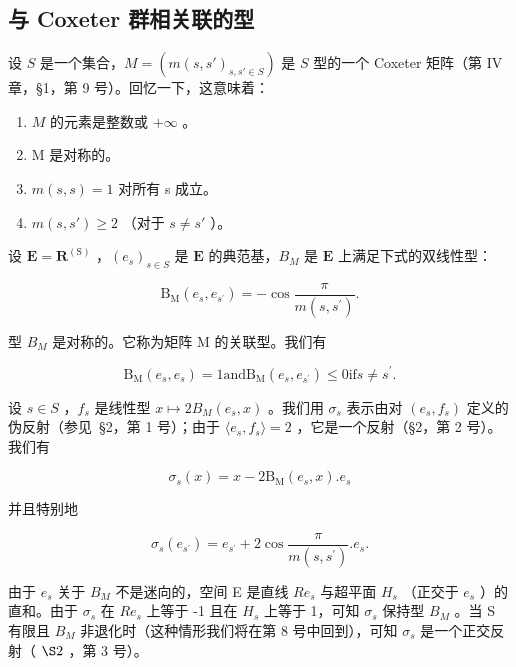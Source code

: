 \subsection{与 Coxeter 群相关联的型}

设 \(S\) 是一个集合，\(M = (m(s, s')_{s, s' \in S})\) 是 \(S\) 型的一个 Coxeter 矩阵（第 IV 章，§1，第 9 号）。回忆一下，这意味着：

\begin{enumerate}
\def\labelenumi{(\arabic{enumi})}
\item
  \(M\) 的元素是整数或 \(+\infty\) 。
\item
  M 是对称的。
\item
  \(m(s, s) = 1\) 对所有 s 成立。
\item
  \(m(s, s') \geqslant 2\) （对于 \(s \neq s'\) ）。
\end{enumerate}

设 \(\mathbf{E} = \mathbf{R}^{(\mathrm{S})}\) ，\((e_s)_{s \in S}\) 是 \(\mathbf{E}\) 的典范基，\(B_M\) 是 \(\mathbf{E}\) 上满足下式的双线性型：

\[
\mathrm{B} _ {\mathrm{M}} (e _ {s}, e _ {s ^ {\prime}}) = - \cos \frac {\pi}{m (s , s ^ {\prime})}.
\]

型 \(B_{M}\) 是对称的。它称为矩阵 M 的关联型。我们有

\[
\mathrm{B} _ {\mathrm{M}} \left(e _ {s}, e _ {s}\right) = 1 \text {and} \mathrm{B} _ {\mathrm{M}} \left(e _ {s}, e _ {s ^ {\prime}}\right) \leqslant 0 \text {if} s \neq s ^ {\prime}.
\]

设 \(s \in S\) ，\(f_s\) 是线性型 \(x \mapsto 2B_M(e_s, x)\) 。我们用 \(\sigma_s\) 表示由对 \((e_s, f_s)\) 定义的伪反射（参见~§2，第 1 号）；由于 \(\langle e_s, f_s \rangle = 2\) ，它是一个反射（§2，第 2 号）。我们有

\[
\sigma_ {s} (x) = x - 2 \mathrm{B} _ {\mathrm{M}} (e _ {s}, x). e _ {s}
\]

并且特别地

\[
\sigma_ {s} (e _ {s ^ {\prime}}) = e _ {s ^ {\prime}} + 2 \cos \frac {\pi}{m (s , s ^ {\prime})}. e _ {s}.
\]

由于 \(e_{s}\) 关于 \(B_{M}\) 不是迷向的，空间 E 是直线 \(Re_{s}\) 与超平面 \(H_{s}\) （正交于 \(e_{s}\) ）的直和。由于 \(\sigma_{s}\) 在 \(Re_{s}\) 上等于 -1 且在 \(H_{s}\) 上等于 1，可知 \(\sigma_{s}\) 保持型 \(B_{M}\) 。当 S 有限且 \(B_{M}\) 非退化时（这种情形我们将在第 8 号中回到），可知 \(\sigma_{s}\) 是一个正交反射（ \(\S2\) ，第 3 号）。

